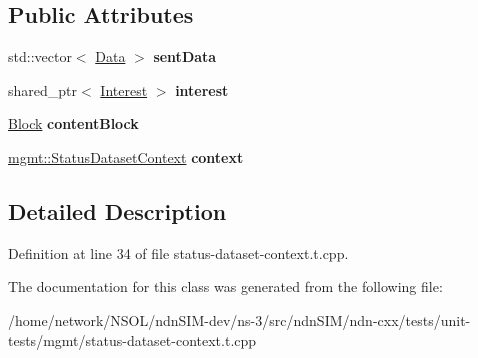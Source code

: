 \subsection*{Public Attributes}
\begin{DoxyCompactItemize}
\item 
std\+::vector$<$ \hyperlink{classndn_1_1Data}{Data} $>$ {\bfseries sent\+Data}\hypertarget{classndn_1_1mgmt_1_1tests_1_1StatusDatasetContextFixture_a7d2ecf9cb2c4e97c553c71cff17e770d}{}\label{classndn_1_1mgmt_1_1tests_1_1StatusDatasetContextFixture_a7d2ecf9cb2c4e97c553c71cff17e770d}

\item 
shared\+\_\+ptr$<$ \hyperlink{classndn_1_1Interest}{Interest} $>$ {\bfseries interest}\hypertarget{classndn_1_1mgmt_1_1tests_1_1StatusDatasetContextFixture_a89601f220f7d511c75e89bdf24fa3f07}{}\label{classndn_1_1mgmt_1_1tests_1_1StatusDatasetContextFixture_a89601f220f7d511c75e89bdf24fa3f07}

\item 
\hyperlink{classndn_1_1Block}{Block} {\bfseries content\+Block}\hypertarget{classndn_1_1mgmt_1_1tests_1_1StatusDatasetContextFixture_ab16203eb930bca9bd525fde509ea3014}{}\label{classndn_1_1mgmt_1_1tests_1_1StatusDatasetContextFixture_ab16203eb930bca9bd525fde509ea3014}

\item 
\hyperlink{classndn_1_1mgmt_1_1StatusDatasetContext}{mgmt\+::\+Status\+Dataset\+Context} {\bfseries context}\hypertarget{classndn_1_1mgmt_1_1tests_1_1StatusDatasetContextFixture_a574db811a0121a9040ad0222044049a2}{}\label{classndn_1_1mgmt_1_1tests_1_1StatusDatasetContextFixture_a574db811a0121a9040ad0222044049a2}

\end{DoxyCompactItemize}


\subsection{Detailed Description}


Definition at line 34 of file status-\/dataset-\/context.\+t.\+cpp.



The documentation for this class was generated from the following file\+:\begin{DoxyCompactItemize}
\item 
/home/network/\+N\+S\+O\+L/ndn\+S\+I\+M-\/dev/ns-\/3/src/ndn\+S\+I\+M/ndn-\/cxx/tests/unit-\/tests/mgmt/status-\/dataset-\/context.\+t.\+cpp\end{DoxyCompactItemize}
